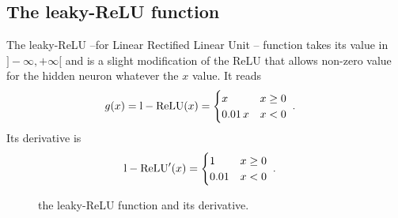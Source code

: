 \subsection{The leaky-ReLU function}


The leaky-ReLU --for Linear Rectified Linear Unit -- function takes its value in $]-\infty,+\infty[$ and is a slight modification of the ReLU that allows non-zero value for the hidden neuron whatever the $x$ value. It reads
\begin{align}
g(x)&={\rm l-ReLU}(x)=\begin{cases} 
      x & x\geq 0 \\
      0.01\,x & x<0 
   \end{cases}\;.
\end{align}
Its derivative is
\begin{align}
{\rm l-ReLU}'(x)&=\begin{cases} 
      1 & x\geq 0 \\
      0.01 & x<0 
   \end{cases}\;.
\end{align}

\begin{figure}[H]
\begin{center}
\end{center}
\caption{\label{fig:lrelu} the leaky-ReLU function and its derivative.}
\end{figure}

